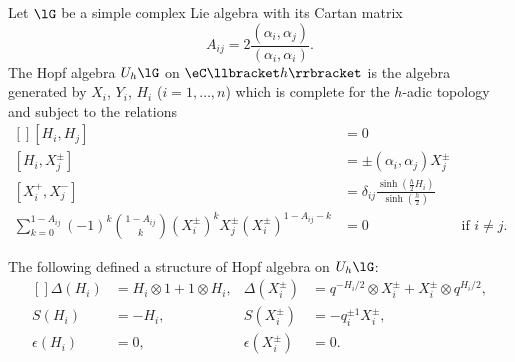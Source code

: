 \begin{definition}
	Let \( \lG\) be a simple complex Lie algebra with its Cartan matrix
	\begin{equation}
		A_{ij}=2\frac{ (\alpha_i,\alpha_j) }{ (\alpha_i,\alpha_i) }.
	\end{equation}
	The Hopf algebra \( U_h\lG\) on \( \eC\llbracket h\rrbracket \) is the algebra generated by \( X_i\), \( Y_i\), \( H_i\) (\( i=1,\ldots,n\)) which is complete for the \( h\)-adic topology and subject to the relations
	\begin{equation}
		\begin{aligned}[]
			[H_i,H_j]                                                                                    & =0                                                                                                                   \\
			[H_i,X^{\pm}_j]                                                                              & =\pm(\alpha_i,\alpha_j)X^{\pm}_j                                                                                     \\
			[X_i^+,X_j^-]                                                                                & =\delta_{ij}\frac{ \sinh\left( \frac{ h }{2}H_i \right) }{ \sinh\left( \frac{ h }{2} \right) }                       \\
			\sum_{k=0}^{1-A_{ij}}(-1)^k\binom{1-A_{ij}}{k}(X_i^{\pm})^kX_j^{\pm}(X_i^{\pm})^{1-A_{ij}-k} & =0                                                                                             & \text{if } i\neq j.
		\end{aligned}
	\end{equation}

\end{definition}

\begin{proposition}
	The following defined a structure of Hopf algebra on \( U_h\lG\):
	\begin{equation}
		\begin{aligned}[]
			\Delta(H_i)   & =H_i\otimes 1+1\otimes H_i, & \Delta(X_i^{\pm})   & =q^{-H_i/2}\otimes X_i^{\pm}+X_i^{\pm}\otimes q^{H_i/2}, \\
			S(H_i)        & =-H_i,                      & S(X_i^{\pm})        & =-q_i^{\pm 1}X_i^{\pm},                                  \\
			\epsilon(H_i) & =0,                         & \epsilon(X_i^{\pm}) & =0.
		\end{aligned}
	\end{equation}

\end{proposition}

